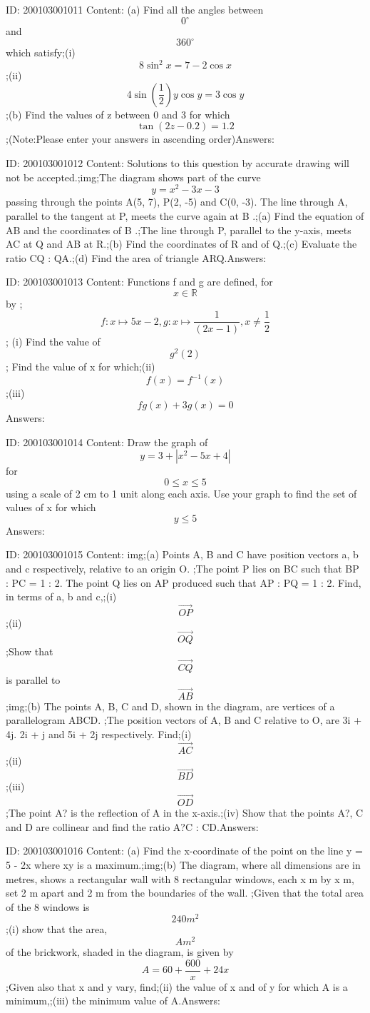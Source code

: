 \documentclass{article}
\begin{document}
ID: 200103001011
Content:
(a) Find all the angles between  \[0^{\circ}\] and \[360^{\circ}\]  which satisfy;(i) \[8\sin^2x=7-2\cos x\];(ii) \[4\sin(\frac{1}{2})y \cos y=3\cos y\];(b)	Find the values of z between 0 and 3 for which \[\tan(2z - 0.2) = 1.2\];(Note:Please enter your answers in ascending order)Answers:

ID: 200103001012
Content:
Solutions to this question by accurate drawing will not be accepted.;img;The diagram shows part of the curve \[y=x^2-3x-3\] passing through the points A(5, 7), P(2, -5) and C(0, -3). The line through A, parallel to the tangent at P, meets the curve again at B .;(a)	Find the equation of AB and the coordinates of B .;The line through P, parallel to the y-axis, meets AC at Q and AB at R.;(b)	Find the coordinates of R and of Q.;(c)	Evaluate the ratio CQ : QA.;(d)	Find the area of triangle ARQ.Answers:

ID: 200103001013
Content:
Functions f and g are defined, for \[x\in \mathbb{R}\] by ; \[f:x \mapsto 5x-2,g:x \mapsto \frac{1}{(2x-1)}, x\neq\frac{1}{2}\]; (i) Find the value of \[g^2(2)\]; Find the value of x for which;(ii) \[f(x)=f^{-1}(x)\];(iii) \[fg(x) + 3g(x) = 0\]Answers:

ID: 200103001014
Content:
Draw the graph of \[y=3+|x^2-5x+4|\] for \[0\leq x\leq 5\] using a scale of 2 cm to 1 unit along each axis. Use your graph to find the set of values of x for which \[y\leq 5\]Answers:

ID: 200103001015
Content:
img;(a)	Points A, B and C have position vectors a, b and c respectively, relative to an origin O. ;The point P lies on BC such that BP : PC = 1 : 2. The point Q lies on AP produced such that AP : PQ = 1 : 2. Find, in terms of a, b and c,;(i) \[\vec{OP}\];(ii) \[\vec{OQ}\];Show that \[\vec{CQ}\] is parallel to \[\vec{AB}\];img;(b)	The points A, B, C and D, shown in the diagram, are vertices of a parallelogram ABCD. ;The position vectors of A, B and C relative to O, are 3i + 4j. 2i + j and 5i + 2j respectively. Find;(i) \[\vec{AC}\];(ii) \[\vec{BD}\];(iii) \[\vec{OD}\];The point A? is the reflection of A in the x-axis.;(iv)	Show that the points A?, C and D are collinear and find the ratio A?C : CD.Answers:

ID: 200103001016
Content:
(a)	Find the x-coordinate of the point on the line y = 5 - 2x where xy is a maximum.;img;(b)	The diagram, where all dimensions are in metres, shows a rectangular wall with 8 rectangular windows, each x m by x m, set 2 m apart and 2 m from the boundaries of the wall. ;Given that the total area of the 8 windows is \[240m^2\];(i)	show that the area, \[Am^2\] of the brickwork, shaded in the diagram, is given by \[A=60+\frac{600}{x}+24x\] ;Given also that x and y vary, find;(ii)	the value of x and of y for which A is a minimum,;(iii)	the minimum value of A.Answers:
\end{document}
